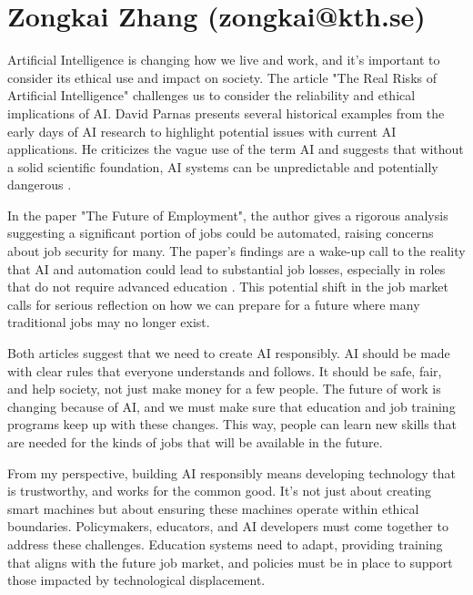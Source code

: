 \documentclass[12pt]{article}
\begin{document}
\section{Zongkai Zhang (zongkai@kth.se)}
{
\setlength\parindent{0pt}   %
\setlength{\parskip}{\bigskipamount}    %

Artificial Intelligence is changing how we live and work, and it's important to consider its ethical use and impact on society. The article "The Real Risks of Artificial Intelligence" challenges us to consider the reliability and ethical implications of AI. David Parnas presents several historical examples from the early days of AI research to highlight potential issues with current AI applications. He criticizes the vague use of the term AI and suggests that without a solid scientific foundation, AI systems can be unpredictable and potentially dangerous \cite{realriskofai}.

In the paper "The Future of Employment", the author gives a rigorous analysis suggesting a significant portion of jobs could be automated, raising concerns about job security for many. The paper's findings are a wake-up call to the reality that AI and automation could lead to substantial job losses, especially in roles that do not require advanced education \cite{futuremployment}. This potential shift in the job market calls for serious reflection on how we can prepare for a future where many traditional jobs may no longer exist.

Both articles suggest that we need to create AI responsibly. AI should be made with clear rules that everyone understands and follows. It should be safe, fair, and help society, not just make money for a few people. The future of work is changing because of AI, and we must make sure that education and job training programs keep up with these changes. This way, people can learn new skills that are needed for the kinds of jobs that will be available in the future.

From my perspective, building AI responsibly means developing technology that is trustworthy, and works for the common good. It's not just about creating smart machines but about ensuring these machines operate within ethical boundaries. Policymakers, educators, and AI developers must come together to address these challenges. Education systems need to adapt, providing training that aligns with the future job market, and policies must be in place to support those impacted by technological displacement.

}
\end{document}
